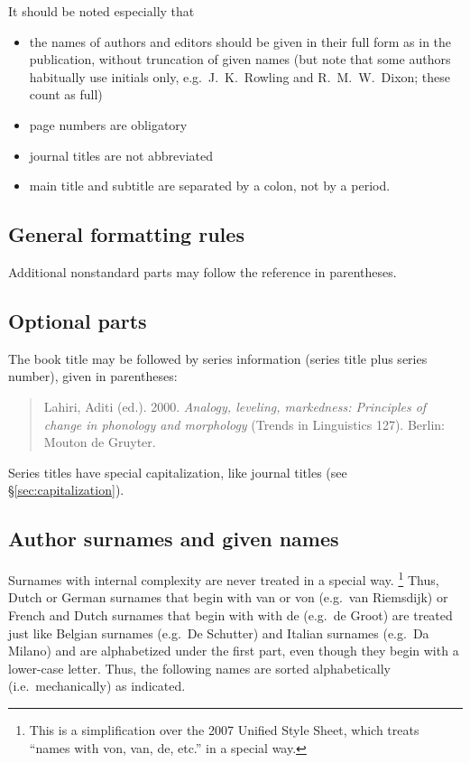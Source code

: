 \documentclass[a4paper]{article}
\newenvironment{gsrexq}{\begin{quote}\color{blue}}{\end{quote}}
\newcommand{\gsrex}[1]{{\color{blue}#1}}
\newcommand{\sectref}[1]{\S\ref{#1}}
\begin{document}
It should be noted especially that

\begin{itemize}
\item  the names of authors and editors should be given in their full form as in the publication, without truncation of given names (but note that some authors habitually use initials only, e.g.~\gsrex{J.~K.~Rowling} and \gsrex{R.~M.~W.~Dixon}; these count as full)
\item page numbers are obligatory
\item journal titles are not abbreviated
\item main title and subtitle are separated by a colon, not by a period.
\end{itemize}

\subsection{General formatting rules}\label{sec:general-formatting-rules}

Additional nonstandard parts may follow the reference in parentheses.

\subsection{Optional parts}\label{sec:optional-parts}

The book title may be followed by series information (series title plus
series number), given in parentheses: 
\begin{gsrexq}
Lahiri, Aditi (ed.). 2000. \textit{Analogy, leveling, markedness: Principles of change in phonology and morphology} (Trends in Linguistics 127). Berlin: Mouton de Gruyter.
\end{gsrexq}

Series titles have special capitalization, like journal titles (see \sectref{sec:capitalization}). 

\subsection{Author surnames and given names}\label{sec:author-surnames-and-given-names}

Surnames with internal complexity are never treated in a special way.
\footnote{This 
  is a simplification over the 2007 Unified Style Sheet, which treats ``names with von, van, de, etc.'' in a special way.
}
Thus, Dutch or German surnames that begin with van or von (e.g.~van
Riemsdijk) or French and Dutch surnames that begin with with de (e.g.~de
Groot) are treated just like Belgian surnames (e.g.~De Schutter) and
Italian surnames (e.g.~Da Milano) and are alphabetized under the first
part, even though they begin with a lower-case letter. Thus, the
following names are sorted alphabetically (i.e.~mechanically) as
indicated. 
\end{document}
